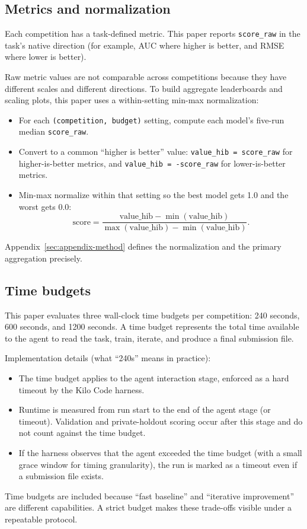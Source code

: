 \subsection{Metrics and normalization}
Each competition has a task-defined metric. This paper reports \texttt{score\_raw} in the task's native direction (for example, AUC where higher is better, and RMSE where lower is better).

Raw metric values are not comparable across competitions because they have different scales and different directions. To build aggregate leaderboards and scaling plots, this paper uses a within-setting min-max normalization:
\begin{itemize}
  \item For each \texttt{(competition, budget)} setting, compute each model's five-run median \texttt{score\_raw}.
  \item Convert to a common ``higher is better'' value: \texttt{value\_hib = score\_raw} for higher-is-better metrics, and \texttt{value\_hib = -score\_raw} for lower-is-better metrics.
  \item Min-max normalize within that setting so the best model gets 1.0 and the worst gets 0.0:
    \[
      \mathrm{score} = \frac{\mathrm{value\_hib} - \min(\mathrm{value\_hib})}{\max(\mathrm{value\_hib}) - \min(\mathrm{value\_hib})}.
    \]
\end{itemize}

Appendix~\ref{sec:appendix-method} defines the normalization and the primary aggregation precisely.

\subsection{Time budgets}
This paper evaluates three wall-clock time budgets per competition: 240 seconds, 600 seconds, and 1200 seconds. A time budget represents the total time available to the agent to read the task, train, iterate, and produce a final submission file.

Implementation details (what ``240s'' means in practice):
\begin{itemize}
  \item The time budget applies to the agent interaction stage, enforced as a hard timeout by the Kilo Code harness.
  \item Runtime is measured from run start to the end of the agent stage (or timeout). Validation and private-holdout scoring occur after this stage and do not count against the time budget.
  \item If the harness observes that the agent exceeded the time budget (with a small grace window for timing granularity), the run is marked as a timeout even if a submission file exists.
\end{itemize}

Time budgets are included because ``fast baseline'' and ``iterative improvement'' are different capabilities. A strict budget makes these trade-offs visible under a repeatable protocol.
